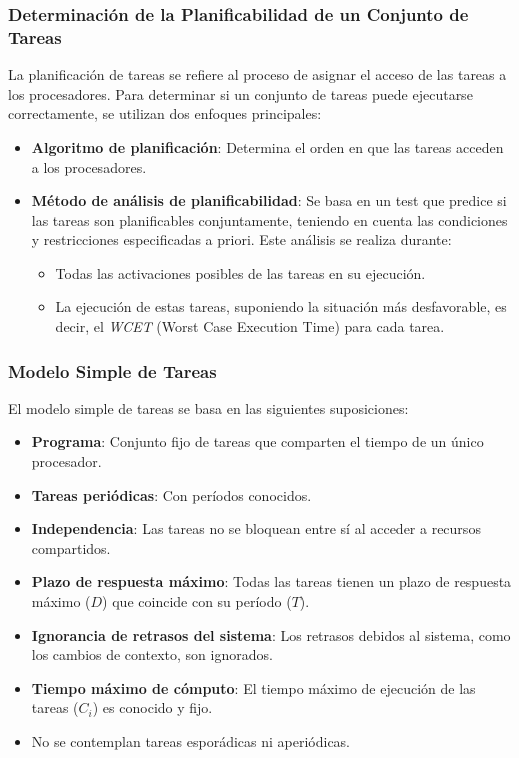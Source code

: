 \documentclass[a4paper,12pt]{article}
\begin{document}
\subsubsection{Determinación de la Planificabilidad de un Conjunto de Tareas}

La planificación de tareas se refiere al proceso de asignar el acceso de las tareas a los procesadores. Para determinar si un conjunto de tareas puede ejecutarse correctamente, se utilizan dos enfoques principales:

\begin{itemize}
    \item \textbf{Algoritmo de planificación}: Determina el orden en que las tareas acceden a los procesadores.
    \item \textbf{Método de análisis de planificabilidad}: Se basa en un test que predice si las tareas son planificables conjuntamente, teniendo en cuenta las condiciones y restricciones especificadas a priori. Este análisis se realiza durante:
    \begin{itemize}
        \item Todas las activaciones posibles de las tareas en su ejecución.
        \item La ejecución de estas tareas, suponiendo la situación más desfavorable, es decir, el \textit{WCET} (Worst Case Execution Time) para cada tarea.
    \end{itemize}
\end{itemize}

\subsubsection{Modelo Simple de Tareas}

El modelo simple de tareas se basa en las siguientes suposiciones:

\begin{itemize}
    \item \textbf{Programa}: Conjunto fijo de tareas que comparten el tiempo de un único procesador.
    \item \textbf{Tareas periódicas}: Con períodos conocidos.
    \item \textbf{Independencia}: Las tareas no se bloquean entre sí al acceder a recursos compartidos.
    \item \textbf{Plazo de respuesta máximo}: Todas las tareas tienen un plazo de respuesta máximo (\(D\)) que coincide con su período (\(T\)).
    \item \textbf{Ignorancia de retrasos del sistema}: Los retrasos debidos al sistema, como los cambios de contexto, son ignorados.
    \item \textbf{Tiempo máximo de cómputo}: El tiempo máximo de ejecución de las tareas (\(C_i\)) es conocido y fijo.
    \item No se contemplan tareas esporádicas ni aperiódicas.
\end{itemize}
\end{document}
